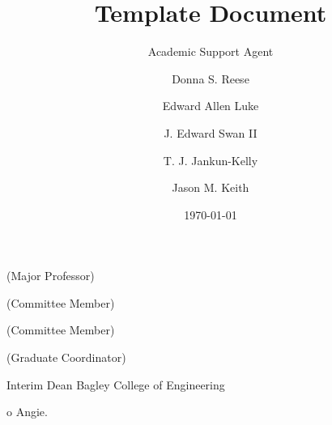 \documentclass{article}
\title{Template Document}
\author{Academic Support Agent}
\date{\today}
\begin{document}
\maketitle


\maketitlepage
\copyrightpage    %


\approvals
\begin{center}
\signature{%
Donna S. Reese
}{(Major Professor)
}{}{}
\\
\signature{%
Edward Allen Luke
}{(Committee Member)
}{}{}
\\
\signature{%
J. Edward Swan II
}{(Committee Member)
}{}{}
\\
\signature{%
T. J. Jankun-Kelly
}{(Graduate Coordinator)
}{}{}
\\
\signature{%
Jason M. Keith
}{Interim Dean 
}{Bagley College of Engineering
}{
}
\end{center}

\abstractpage

\settowidth{\tmplen}{\kwlist}
%



\dedication       %
To Angie.

\acknowledgments  %







\listofsymbols %
\end{document}
